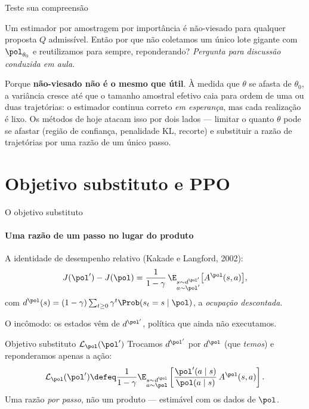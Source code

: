 \documentclass[aspectratio=169, 10pt]{beamer}
\newcommand{\paradiscussao}{\smallskip
  {\footnotesize\color{rlCinza}\itshape Pergunta para discussão conduzida em aula.}}
\newcommand{\thv}{\theta}
\newcommand{\polnovo}{\pol'}
\newcommand{\Advpi}{A^{\pol}}
\newcommand{\dpi}{d^{\pol}}
\newcommand{\Lsub}[1]{\mathcal{L}_{#1}}
\begin{document}
\begin{frame}{Teste sua compreensão}

  \begin{quizbox}{}
    Um estimador por amostragem por importância é não-viesado para qualquer
    proposta $Q$ admissível. Então por que não coletamos um único lote gigante com
    $\pol_{\thv_0}$ e reutilizamos para sempre, reponderando?
    \paradiscussao
  \end{quizbox}

  \pause

  \begin{respbox}
    Porque \textbf{não-viesado não é o mesmo que útil}. À medida que $\thv$ se afasta
    de $\thv_0$, a variância cresce até que o tamanho amostral efetivo caia para
    ordem de uma ou duas trajetórias: o estimador continua correto \emph{em
    esperança}, mas cada realização é lixo. Os métodos de hoje atacam isso por dois
    lados --- \alert{limitar o quanto $\thv$ pode se afastar} (região de confiança,
    penalidade KL, recorte) e \alert{substituir a razão de trajetórias por uma razão
    de um único passo}.
  \end{respbox}
\end{frame}

\section{Objetivo substituto e PPO}

\begin{frame}{O objetivo substituto}
  \framesubtitle{Uma razão de um passo no lugar do produto}

  A identidade de desempenho relativo (Kakade e Langford, 2002):
  \[
    J(\polnovo) - J(\pol) = \frac{1}{1-\gamma}\,
      \E_{\substack{s\sim d^{\polnovo}\\ a\sim\polnovo}}\bigl[\Advpi(s,a)\bigr],
  \]
  com $d^{\pol}(s) = (1-\gamma)\sum_{t\ge0}\gamma^t \Prob(s_t = s\mid \pol)$, a \emph{ocupação descontada}.

  \vspace{-0.3em}
  \begin{alertabox}
    O incômodo: os estados vêm de $d^{\polnovo}$, política que ainda não executamos.
  \end{alertabox}

  \pause
  \vspace{-0.3em}
  \begin{defbox}{Objetivo substituto $\Lsub{\pol}(\polnovo)$}
    Trocamos $d^{\polnovo}$ por $\dpi$ (que \emph{temos}) e reponderamos apenas a ação:
    \[
      \Lsub{\pol}(\polnovo) \defeq \frac{1}{1-\gamma}
        \E_{\substack{s\sim \dpi\\ a\sim\pol}}
        \left[\frac{\polnovo(a\mid s)}{\pol(a\mid s)}\,\Advpi(s,a)\right].
    \]
    Uma razão \emph{por passo}, não um produto --- estimável com os dados de $\pol$.
  \end{defbox}
\end{frame}
\end{document}
